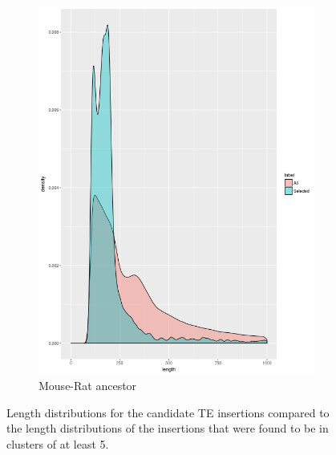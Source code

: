 \documentclass{article}
\begin{document}
\begin{figure}[h]
  \begin{subfigure}[b]{0.5\textwidth}
    \includegraphics[width=\textwidth]{figures/anc04_clustered_dist}
    \caption{Mouse-Rat ancestor}
  \end{subfigure}
  \caption{Length distributions for the candidate TE insertions compared to the length distributions of the insertions that were found to be in clusters of at least 5.}
  \label{fig:after_selection}
\end{figure}
\end{document}
